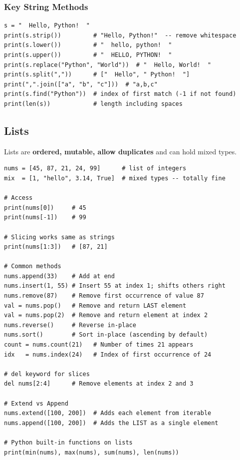 \documentclass[12pt,a4paper]{article}
\begin{document}
\subsubsection{Key String Methods}

\begin{lstlisting}
s = "  Hello, Python!  "
print(s.strip())         # "Hello, Python!"  -- remove whitespace
print(s.lower())         # "  hello, python!  "
print(s.upper())         # "  HELLO, PYTHON!  "
print(s.replace("Python", "World"))  # "  Hello, World!  "
print(s.split(","))      # ["  Hello", " Python!  "]
print(",".join(["a", "b", "c"]))  # "a,b,c"
print(s.find("Python"))  # index of first match (-1 if not found)
print(len(s))            # length including spaces
\end{lstlisting}

\subsection{Lists}

Lists are \textbf{ordered, mutable, allow duplicates} and can hold mixed types.

\begin{lstlisting}
nums = [45, 87, 21, 24, 99]      # list of integers
mix  = [1, "hello", 3.14, True]  # mixed types -- totally fine

# Access
print(nums[0])     # 45
print(nums[-1])    # 99

# Slicing works same as strings
print(nums[1:3])   # [87, 21]

# Common methods
nums.append(33)    # Add at end
nums.insert(1, 55) # Insert 55 at index 1; shifts others right
nums.remove(87)    # Remove first occurrence of value 87
val = nums.pop()   # Remove and return LAST element
val = nums.pop(2)  # Remove and return element at index 2
nums.reverse()     # Reverse in-place
nums.sort()        # Sort in-place (ascending by default)
count = nums.count(21)   # Number of times 21 appears
idx   = nums.index(24)   # Index of first occurrence of 24

# del keyword for slices
del nums[2:4]      # Remove elements at index 2 and 3

# Extend vs Append
nums.extend([100, 200])  # Adds each element from iterable
nums.append([100, 200])  # Adds the LIST as a single element

# Python built-in functions on lists
print(min(nums), max(nums), sum(nums), len(nums))
\end{lstlisting}
\end{document}
